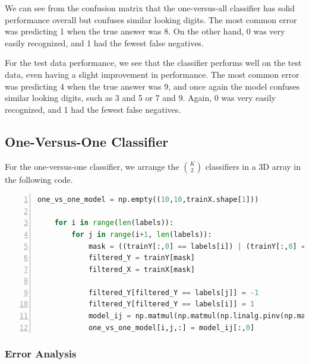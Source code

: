\documentclass{article}
\begin{document}
We can see from the confusion matrix that the one-versus-all classifier has solid performance overall but confuses similar looking digits.
The most common error was predicting 1 when the true answer was 8.
On the other hand, 0 was very easily recognized, and 1 had the fewest false negatives.

For the test data performance, we see that the classifier performs well on the test data, even having a slight improvement in performance.
The most common error was predicting 4 when the true answer was 9, and once again the model confuses similar looking digits, such as 3 and 5 or 7 and 9.
Again, 0 was very easily recognized, and 1 had the fewest false negatives.

\FloatBarrier
\subsection{One-Versus-One Classifier}
For the one-versus-one classifier, we arrange the $\binom{K}{2}$ classifiers in a 3D array in the following code.
\begin{lstlisting}[frame=single,language=Python, numbers=left, breaklines]
    one_vs_one_model = np.empty((10,10,trainX.shape[1]))

    for i in range(len(labels)):
        for j in range(i+1, len(labels)):
            mask = ((trainY[:,0] == labels[i]) | (trainY[:,0] == labels[j]))
            filtered_Y = trainY[mask]
            filtered_X = trainX[mask]

            filtered_Y[filtered_Y == labels[j]] = -1
            filtered_Y[filtered_Y == labels[i]] = 1
            model_ij = np.matmul(np.matmul(np.linalg.pinv(np.matmul(filtered_X.transpose(),filtered_X)),filtered_X.transpose()),filtered_Y)
            one_vs_one_model[i,j,:] = model_ij[:,0]
\end{lstlisting}

\subsubsection{Error Analysis}

\FloatBarrier
\end{document}
